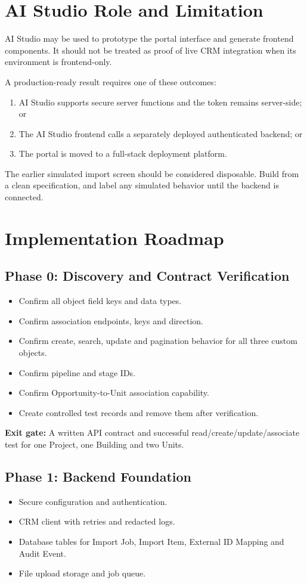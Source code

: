 \documentclass[10pt]{article}
\begin{document}
\section{AI Studio Role and Limitation}
AI Studio may be used to prototype the portal interface and generate frontend components. It should not be treated as proof of live CRM integration when its environment is frontend-only.

A production-ready result requires one of these outcomes:
\begin{enumerate}
\item AI Studio supports secure server functions and the token remains server-side; or
\item The AI Studio frontend calls a separately deployed authenticated backend; or
\item The portal is moved to a full-stack deployment platform.
\end{enumerate}

The earlier simulated import screen should be considered disposable. Build from a clean specification, and label any simulated behavior until the backend is connected.

\section{Implementation Roadmap}
\subsection{Phase 0: Discovery and Contract Verification}
\begin{itemize}
\item Confirm all object field keys and data types.
\item Confirm association endpoints, keys and direction.
\item Confirm create, search, update and pagination behavior for all three custom objects.
\item Confirm pipeline and stage IDs.
\item Confirm Opportunity-to-Unit association capability.
\item Create controlled test records and remove them after verification.
\end{itemize}

\textbf{Exit gate:} A written API contract and successful read/create/update/associate test for one Project, one Building and two Units.

\subsection{Phase 1: Backend Foundation}
\begin{itemize}
\item Secure configuration and authentication.
\item CRM client with retries and redacted logs.
\item Database tables for Import Job, Import Item, External ID Mapping and Audit Event.
\item File upload storage and job queue.
\end{itemize}
\end{document}
